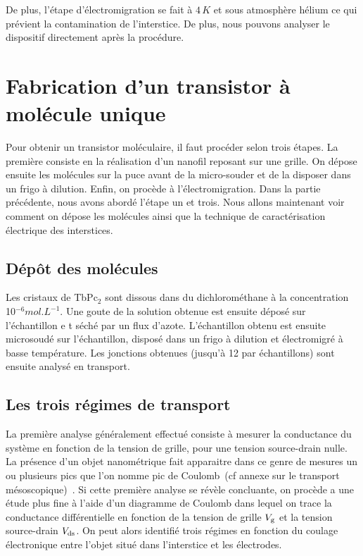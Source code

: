 De plus, l'étape d'électromigration se fait à $4\,K$ et sous atmosphère hélium ce qui prévient la contamination de l'interstice. De plus, nous pouvons analyser le dispositif directement après la procédure.


\section{Fabrication d'un transistor à molécule unique}
Pour obtenir un transistor moléculaire, il faut procéder selon trois étapes. La première consiste en la réalisation d'un nanofil reposant sur une grille. On dépose ensuite les molécules sur la puce avant de la micro-souder et de la disposer dans un frigo à dilution. Enfin, on procède à l'électromigration. Dans la partie précédente, nous avons abordé l'étape un et trois. Nous allons maintenant voir comment on dépose les molécules ainsi que la technique de caractérisation électrique des interstices.

\subsection{Dép\^ot des molécules}
Les cristaux de TbPc$_{2}$ sont dissous dans du dichlorométhane à la concentration 10$^{-6}mol.L^{-1}$. Une goute de la solution obtenue est ensuite déposé sur l'échantillon e t séché par un flux d'azote. L'échantillon obtenu est ensuite microsoudé sur l'échantillon, disposé dans un frigo à dilution et électromigré à basse température. Les jonctions obtenues (jusqu'à 12 par échantillons) sont ensuite analysé en transport.

\subsection{Les trois régimes de transport}
La première analyse généralement effectué consiste à mesurer la conductance du système en fonction de la tension de grille, pour une tension source-drain nulle. La présence d'un objet nanométrique fait apparaitre dans ce genre de mesures un ou plusieurs pics que l'on nomme pic de Coulomb~(cf annexe sur le transport mésoscopique)~\cite{Beenakker1991,Wiel2002,Hanson2007}. Si cette première analyse se révèle concluante, on procède a une étude plus fine à l'aide d'un diagramme de Coulomb dans lequel on trace la conductance différentielle en fonction de la tension de grille $V_{\rm{g}}$ et la tension source-drain $V_{\rm{ds}}$. On peut alors identifié trois régimes en fonction du coulage électronique entre l'objet situé dans l'interstice et les électrodes.
